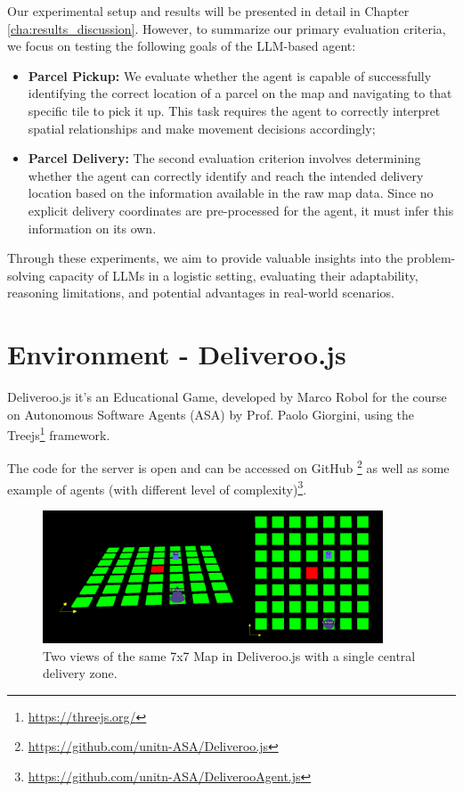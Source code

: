 Our experimental setup and results will be presented in detail in Chapter
\ref{cha:results_discussion}. However, to summarize our primary evaluation
criteria, we focus on testing the following goals of the LLM-based agent:

\begin{itemize}
  \item \textbf{Parcel Pickup:} We evaluate whether the agent is capable of
    successfully identifying the correct location of a parcel on the map and
    navigating to that specific tile to pick it up. This task requires the agent
    to correctly interpret spatial relationships and make movement decisions accordingly;

  \item \textbf{Parcel Delivery:} The second evaluation criterion involves
    determining whether the agent can correctly identify and reach the intended
    delivery location based on the information available in the raw map data. Since
    no explicit delivery coordinates are pre-processed for the agent, it must
    infer this information on its own.
\end{itemize}

Through these experiments, we aim to provide valuable insights into the problem-solving
capacity of LLMs in a logistic setting, evaluating their adaptability, reasoning
limitations, and potential advantages in real-world scenarios.

\section{Environment - Deliveroo.js}
\label{sec:environment_deliveroo_js}

Deliveroo.js it's an Educational Game, developed by Marco Robol for the course
on Autonomous Software Agents (ASA) by Prof. Paolo Giorgini, using the Treejs\footnote{\url{https://threejs.org/}}
framework.

The code for the server is open and can be accessed on GitHub \footnote{\url{https://github.com/unitn-ASA/Deliveroo.js}}
as well as some example of agents (with different level of complexity)\footnote{\url{https://github.com/unitn-ASA/DeliverooAgent.js}}.

\begin{figure}[h!]
  \centering
  \includegraphics[width=0.90\textwidth]{images/deliveroo_js.png}
  \caption{Two views of the same 7x7 Map in Deliveroo.js with a single central
  delivery zone.}
  \label{fig:deliveroo_js}
\end{figure}

